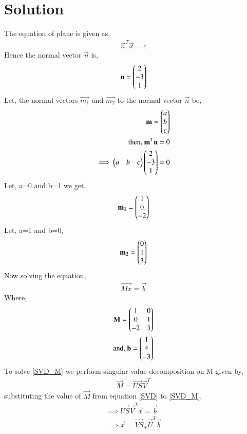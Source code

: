 \documentclass[journal,12pt,twocolumn]{IEEEtran}
\begin{document}
\section{Solution}
The equation of plane is given as, 
\begin{align}
\vec{n}^T\vec{x} = c
\end{align}
Hence the normal vector $\vec{n}$ is,
\begin{align}
\mathbf{n} = \begin{pmatrix}2\\-3\\1\end{pmatrix}
\end{align}
Let, the normal vectors $\vec{m_1}$ and $\vec{m_2}$ to the normal vector $\vec{n}$ be, 
\begin{align}
\mathbf{m} = \begin{pmatrix}a\\b\\c\end{pmatrix}\\
\mbox{then, } \mathbf{m}^T\mathbf{n} = 0\\
\implies \begin{pmatrix}a&b&c\end{pmatrix}\begin{pmatrix}2\\-3\\1\end{pmatrix} = 0
\end{align}  
Let, a=0 and b=1 we get,
\begin{align}
\mathbf{m_1} = \begin{pmatrix}1\\0\\-2\end{pmatrix}
\end{align}
Let, a=1 and b=0,
\begin{align}
\mathbf{m_2} = \begin{pmatrix}0\\1\\3\end{pmatrix}
\end{align}
Now solving the equation,
\begin{align}
\vec{Mx} = \vec{b}
\label{SVD_M}
\end{align}
Where,
\begin{align}
\mathbf{M} = \begin{pmatrix}1&0\\0&1\\-2&3\end{pmatrix}\\
\mbox{and, } \mathbf{b} = \begin{pmatrix}1\\4\\-3\end{pmatrix}\label{b}
\end{align}
To solve \eqref{SVD_M} we perform singular value decomposition on M given by, 
\begin{align}
\vec{M} = \vec{US}\vec{V}^T
\label{SVD}
\end{align}
substituting the value of $\vec{M}$ from equation \eqref{SVD} to \eqref{SVD_M},
\begin{align}
\implies \vec{US}\vec{V}^T\vec{x} = \vec{b}\\
\implies \vec{x} = \vec{VS}_+\vec{U}^T\vec{b} \label{x}
\end{align}
\end{document}
